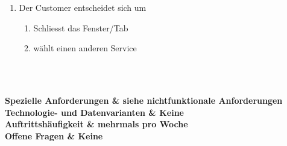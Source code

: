 \documentclass[11pt]{scrartcl}
\begin{document}
\begin{longtabu}
\begin{enumerate}
\begin{enumerate}
		       \item  Der Customer entscheidet sich um
		     \begin{enumerate}
		      \item Schliesst das Fenster/Tab
		      \item wählt einen anderen Service
		    \end{enumerate}
		    
		  \end{enumerate}
			
		\end{enumerate}
	 \\\hline

      \\\hline
	\bfseries Spezielle Anforderungen & siehe nichtfunktionale Anforderungen  \\\hline 
	\bfseries Technologie- und Datenvarianten & Keine  \\\hline 
	\bfseries Auftrittshäufigkeit & mehrmals pro Woche  \\\hline 
	\bfseries Offene Fragen & Keine  \\\hline  
\end{longtabu}
\newpage
\end{document}
